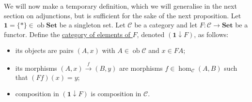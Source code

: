 \documentclass[a4paper,11pt]{article}
\theoremstyle{break_italics}
\theoremstyle{break_upright}
\theoremstyle{remark}
\newcommand{\ob}{\operatorname{ob}}
\newcommand{\C}{\mathcal{C}}
\newcommand{\Set}{\mathbf{Set}}
\begin{document}
We will now make a temporary definition, which we will generalise in the next section on adjunctions, but is sufficient for the sake of the next proposition. Let $\mathbf 1 = \{*\} \in \ob\Set$ be a singleton set. Let $\C$ be a category and let $F \colon \C \to \Set$ be a functor. Define the \uline{category of elements of $F$}, denoted $(\mathbf 1 \downarrow F)$, as follows:
\begin{itemize}
	\item its objects are pairs $(A, x)$ with $A \in \ob\C$ and $x \in FA$;
	\item its morphisms $(A,x) \xrightarrow{f} (B,y)$ are morphisms $f \in \hom_\C(A,B)$ such that $(Ff)(x) = y$;
	\item composition in $(\mathbf 1 \downarrow F)$ is composition in $\C$.
\end{itemize}
\end{document}
